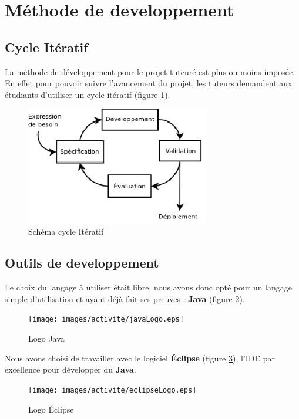 \section{Méthode de developpement}


\subsection{Cycle Itératif}
La méthode de développement pour le projet tuteuré est plus ou moins imposée. En effet pour pouvoir suivre l'avancement du projet, les tuteurs demandent aux étudiants d'utiliser un cycle itératif (figure \ref{cycle_iteratif}).

\begin{figure}[H]
\centering
\includegraphics[width=8cm]{images/activite/cycle_iteratif.eps}
\caption{Schéma cycle Itératif}
\label{cycle_iteratif}
\end{figure}

\subsection{Outils de developpement}
Le choix du langage à utiliser était libre, nous avons donc opté pour un langage simple d'utilisation et ayant déjà fait ses preuves : \textbf{Java} (figure \ref{java_logo}).

\begin{figure}[!h]
\centering
\texttt{[image: images/activite/javaLogo.eps]}
\caption{Logo Java}
\label{java_logo}
\end{figure}

Nous avons choisi de travailler avec le logiciel \textbf{Éclipse} (figure \ref{eclipse_logo}), l'\gls{IDE} par excellence pour développer du \textbf{Java}.

\begin{figure}[H]
\centering
\texttt{[image: images/activite/eclipseLogo.eps]}
\caption{Logo Éclipse}
\label{eclipse_logo}
\end{figure}

